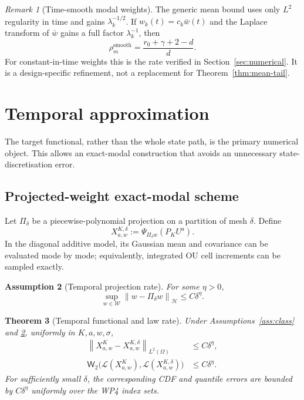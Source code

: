\documentclass[11pt]{article}
\newtheorem{assumption}{Assumption}[section]
\newtheorem{theorem}[assumption]{Theorem}
\theoremstyle{remark}
\newtheorem{remark}[assumption]{Remark}
\newcommand{\Law}{\mathcal L}
\newcommand{\cH}{\mathcal H}
\newcommand{\cW}{\mathcal W}
\newcommand{\norm}[1]{\left\lVert #1\right\rVert}
\newcommand{\Wtwo}{\mathsf W_2}
\begin{document}
\begin{remark}[Time-smooth modal weights]
The generic mean bound uses only $L^2$ regularity in time and gains $\lambda_k^{-1/2}$. If $w_k(t)=c_k\bar w(t)$ and the Laplace transform of $\bar w$ gains a full factor $\lambda_k^{-1}$, then
\begin{equation}\label{eq:const-rate}
 \rho_m^{\mathrm{smooth}}
 =\frac{r_0+\gamma+2-d}{d}.
\end{equation}
For constant-in-time weights this is the rate verified in Section~\ref{sec:numerical}. It is a design-specific refinement, not a replacement for Theorem~\ref{thm:mean-tail}.
\end{remark}

\section{Temporal approximation}

The target functional, rather than the whole state path, is the primary numerical object. This allows an exact-modal construction that avoids an unnecessary state-discretisation error.

\subsection{Projected-weight exact-modal scheme}

Let $\Pi_\delta$ be a piecewise-polynomial projection on a partition of mesh $\delta$. Define
\begin{equation}\label{eq:XKdelta}
 X_{a,w}^{K,\delta}:=\Psi_{\Pi_\delta w}(P_KU^a).
\end{equation}
In the diagonal additive model, its Gaussian mean and covariance can be evaluated mode by mode; equivalently, integrated OU cell increments can be sampled exactly.

\begin{assumption}[Temporal projection rate]\label{ass:temporal-projection}
For some $\eta>0$,
\begin{equation}\label{eq:projection-rate}
 \sup_{w\in\cW}
\norm{w-\Pi_\delta w}_{\cH}
 \le C\delta^\eta.
\end{equation}
\end{assumption}

\begin{theorem}[Temporal functional and law rate]\label{thm:temporal-projection}
Under Assumptions~\ref{ass:class} and \ref{ass:temporal-projection}, uniformly in $K,a,w,\sigma$,
\begin{align}
 \norm{X_{a,w}^{K}-X_{a,w}^{K,\delta}}_{L^2(\Omega)}
 &\le C\delta^\eta,
 \label{eq:temporal-strong}\\
 \Wtwo\big(\Law(X_{a,w}^{K}),\Law(X_{a,w}^{K,\delta})\big)
 &\le C\delta^\eta.
 \label{eq:temporal-w2}
\end{align}
For sufficiently small $\delta$, the corresponding CDF and quantile errors are bounded by $C\delta^\eta$ uniformly over the WP4 index sets.
\end{theorem}
\end{document}

